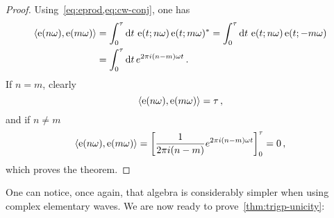\begin{proof}
  Using~\cref{eq:eprod,eq:cw-conj}, one has
  \begin{align}
    \braket{\operatorname{e}(n\omega),\operatorname{e}(m\omega)}&=\int_{0}^{\tau}\mathrm{d} t\,\operatorname{e}(t;n\omega)\operatorname{e}(t;m\omega)^*
    =\int_{0}^{\tau}\mathrm{d} t\,\operatorname{e}(t;n\omega)\operatorname{e}(t;-m\omega)\\
    &=\int_{0}^{\tau}\mathrm{d} t\,e^{2\pi i (n-m)\omega t}\,.
  \end{align}
  If $n=m$, clearly
  \begin{equation}
    \braket{\operatorname{e}(n\omega),\operatorname{e}(m\omega)}=\tau\,,
  \end{equation}
  and if $n\neq m$
  \begin{equation}
    \braket{\operatorname{e}(n\omega),\operatorname{e}(m\omega)}=
    \left[\frac{1}{2\pi i (n-m)}e^{2\pi i (n-m)\omega t}\right]_0^\tau=0\,,
  \end{equation}
  which proves the theorem.
\end{proof}
One can notice, once again, that algebra is considerably simpler when using complex
elementary waves. We are now ready to prove~\cref{thm:trigp-unicity}:

